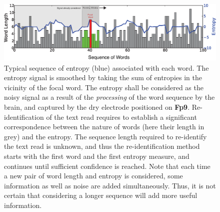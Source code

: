 \begin{figure}[H]
\centering
\includegraphics[width=15cm]{figures/lWordsEntropyTimeline.eps}
\caption{Typical sequence of entropy (blue) associated with each word. The entropy signal is smoothed by taking the sum of entropies in the vicinity of the focal word. The entropy shall be considered as the noisy signal as a result of the {\it processing} of the word sequence by the brain, and captured by the dry electrode positioned on {\bf Fp9}. Re-identification of the text read requires to establish a significant correspondence between the nature of words (here their length in grey) and the entropy. The sequence length required to re-identify the text read is unknown, and thus the re-identification method starts with the first word and the first entropy measure, and continues until sufficient confidence is reached. Note that each time a new pair of word length and entropy is considered, some information as well as noise are added simultaneously. Thus, it is not certain that considering a longer sequence will add more useful information.}
\label{fig:sequences}
\end{figure}

